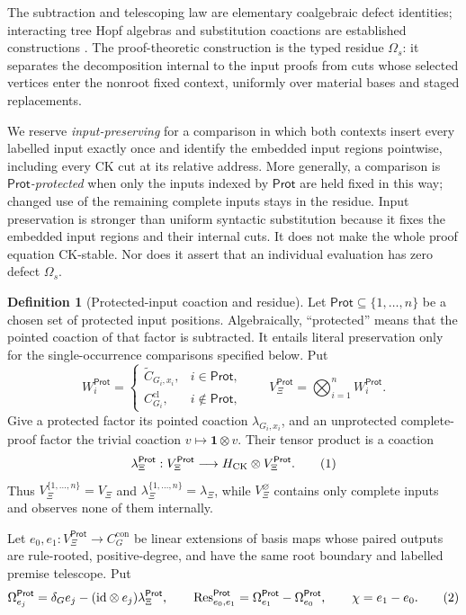 \documentclass[10pt,a4paper]{article}
\theoremstyle{plain}
\theoremstyle{definition}
\newtheorem{definition}[theorem]{Definition}
\theoremstyle{remark}
\newcommand{\HCK}{H_{\mathrm{CK}}}
\newcommand{\one}{\mathbf 1}
\newcommand{\eqtag}{\refstepcounter{equation}\tag{\theequation}}
\begin{document}
The subtraction and telescoping law are elementary coalgebraic defect
identities; interacting tree Hopf algebras and substitution coactions are
established constructions \cite{calaqueebrahimifardmanchon2011}.  The
proof-theoretic construction is the typed residue
\(\Omega_s\): it separates the decomposition internal to the input proofs
from cuts whose selected vertices enter the nonroot fixed context,
uniformly over material bases and staged replacements.

We reserve \emph{input-preserving} for a comparison in which both contexts
insert every labelled input exactly once and identify the embedded input
regions pointwise, including every CK cut at its relative address.
More generally, a comparison is \emph{\(\mathsf{Prot}\)-protected} when only the
inputs indexed by \(\mathsf{Prot}\) are held fixed in this way; changed use of the
remaining complete inputs stays in the residue.  Input preservation is
stronger than uniform syntactic substitution because it fixes the embedded
input regions and their internal cuts.  It does not make the whole proof
equation CK-stable.  Nor does it assert that an individual evaluation has
zero defect \(\Omega_s\).

\begin{definition}[Protected-input coaction and residue]
\label{def:protected-input-coaction}
Let \(\mathsf{Prot}\subseteq\{1,\ldots,n\}\) be a chosen set of protected input
positions.  Algebraically, ``protected'' means that the pointed coaction
of that factor is subtracted.  It entails literal preservation only for
the single-occurrence comparisons specified below.  Put
\[
 W_i^{\mathsf{Prot}}=
 \begin{cases}
   \widetilde C_{G_i,x_i},&i\in\mathsf{Prot},\\
   C_{G_i}^{\mathrm{cl}},&i\notin\mathsf{Prot},
 \end{cases}
 \qquad
 V_\Xi^{\mathsf{Prot}}=\bigotimes_{i=1}^n W_i^{\mathsf{Prot}} .
\]
Give a protected factor its pointed coaction
\(\lambda_{G_i,x_i}\), and an unprotected complete-proof factor the trivial
coaction \(v\mapsto\one\otimes v\).  Their tensor product is a coaction
\[
             \lambda_\Xi^{\mathsf{Prot}}:V_\Xi^{\mathsf{Prot}}\longrightarrow
                    \HCK\otimes V_\Xi^{\mathsf{Prot}} .
\eqtag\label{eq:protected-input-coaction}
\]
Thus \(V_\Xi^{\{1,\ldots,n\}}=V_\Xi\) and
\(\lambda_\Xi^{\{1,\ldots,n\}}=\lambda_\Xi\), while
\(V_\Xi^\varnothing\) contains only complete inputs and observes none
of them internally.

Let \(e_0,e_1:V_\Xi^{\mathsf{Prot}}\to C_G^{\mathrm{con}}\) be linear extensions of
basis maps whose paired outputs are rule-rooted, positive-degree, and have
the same root boundary and labelled premise telescope.  Put
\[
 \Omega_{e_j}^{\mathsf{Prot}}
   =\delta_Ge_j-(\mathrm{id}\otimes e_j)\lambda_\Xi^{\mathsf{Prot}},\qquad
 \operatorname{Res}_{e_0,e_1}^{\mathsf{Prot}}
   =\Omega_{e_1}^{\mathsf{Prot}}-\Omega_{e_0}^{\mathsf{Prot}},\qquad
 \chi=e_1-e_0 .
\eqtag\label{eq:protected-relative-residue}
\]
\end{definition}
\end{document}
